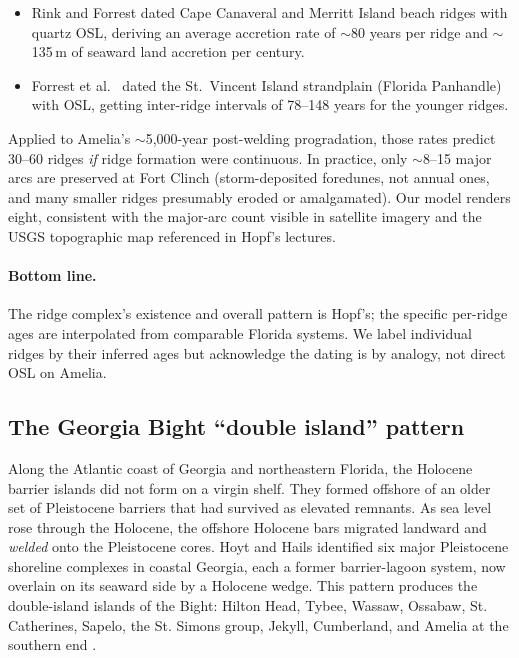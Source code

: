 \documentclass[11pt]{article}
\begin{document}
\begin{itemize}[leftmargin=2em]
\item Rink and Forrest \cite{rink2008} dated Cape Canaveral and Merritt
Island beach ridges with quartz OSL, deriving an average accretion
rate of $\sim$80 years per ridge and $\sim$135\,m of seaward land
accretion per century.
\item Forrest et al.\ \cite{forrest2007} dated the St.\ Vincent Island
strandplain (Florida Panhandle) with OSL, getting inter-ridge intervals
of 78--148 years for the younger ridges.
\end{itemize}

\noindent Applied to Amelia's $\sim$5{,}000-year post-welding
progradation, those rates predict 30--60 ridges \emph{if} ridge
formation were continuous. In practice, only $\sim$8--15 major arcs
are preserved at Fort Clinch (storm-deposited foredunes, not annual
ones, and many smaller ridges presumably eroded or amalgamated). Our
model renders eight, consistent with the major-arc count visible in
satellite imagery and the USGS topographic map referenced in
Hopf's lectures.

\paragraph{Bottom line.}
The ridge complex's existence and overall pattern is Hopf's; the
specific per-ridge ages are interpolated from comparable Florida
systems. We label individual ridges by their inferred ages but
acknowledge the dating is by analogy, not direct OSL on Amelia.

\subsection{The Georgia Bight ``double island'' pattern}

Along the Atlantic coast of Georgia and northeastern Florida, the Holocene barrier
islands did not form on a virgin shelf. They formed offshore of an older set of
Pleistocene barriers that had survived as elevated remnants. As sea level rose
through the Holocene, the offshore Holocene bars migrated landward and \emph{welded}
onto the Pleistocene cores. Hoyt and Hails \cite{hoyt1967} identified six major
Pleistocene shoreline complexes in coastal Georgia, each a former barrier-lagoon
system, now overlain on its seaward side by a Holocene wedge. This pattern produces
the double-island islands of the Bight: Hilton Head, Tybee, Wassaw, Ossabaw, St.
Catherines, Sapelo, the St. Simons group, Jekyll, Cumberland, and Amelia at the
southern end \cite{georgiabight}.
\end{document}
